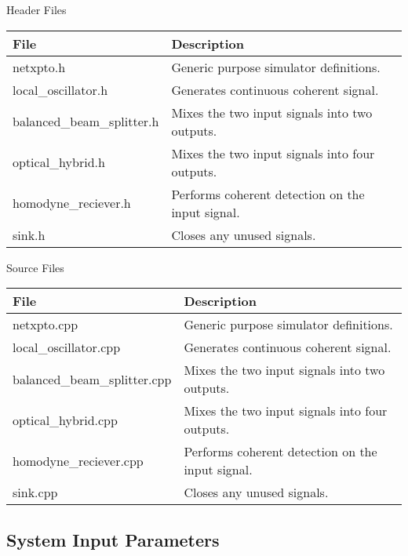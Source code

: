 Header Files
\begin{table}[H]
\centering
\begin{tabulary}{1.0\textwidth}{|L|L|}
\hline
\textbf{File}              & \textbf{Description} 				            \\ \hline
netxpto.h                  & Generic purpose simulator definitions.	        \\ \hline
local\_oscillator.h        & Generates continuous coherent signal.            \\ \hline
balanced\_beam\_splitter.h & Mixes the two input signals into two outputs.    \\ \hline
optical\_hybrid.h          & Mixes the two input signals into four outputs.   \\ \hline
homodyne\_reciever.h       & Performs coherent detection on the input signal. \\ \hline
sink.h                     & Closes any unused signals.                       \\ \hline
\end{tabulary}
\end{table}
%
Source Files
\begin{table}[H]
\centering
\begin{tabulary}{1.0\textwidth}{|L|L|}
\hline
\textbf{File}                & \textbf{Description} 					          \\ \hline
netxpto.cpp                  & Generic purpose simulator definitions.	          \\ \hline
local\_oscillator.cpp        & Generates continuous coherent signal.            \\ \hline
balanced\_beam\_splitter.cpp & Mixes the two input signals into two outputs.    \\ \hline
optical\_hybrid.cpp          & Mixes the two input signals into four outputs.   \\ \hline
homodyne\_reciever.cpp       & Performs coherent detection on the input signal. \\ \hline
sink.cpp                     & Closes any unused signals.                       \\ \hline
\end{tabulary}
\end{table}


\subsection*{System Input Parameters}

